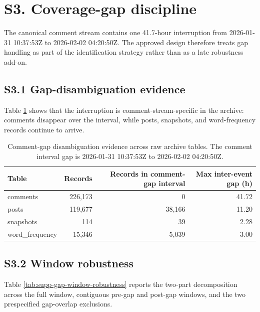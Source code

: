 \section*{S3. Coverage-gap discipline}
\SupplementMixedEvidenceNote

The canonical comment stream contains one 41.7-hour interruption from
2026-01-31 10:37:53Z to 2026-02-02 04:20:50Z. The approved design therefore
treats gap handling as part of the identification strategy rather than as a
late robustness add-on.

\subsection*{S3.1 Gap-disambiguation evidence}

Table \ref{tab:supp-gap-disambiguation} shows that the interruption is
comment-stream-specific in the archive: comments disappear over the interval,
while posts, snapshots, and word-frequency records continue to arrive.

\begin{table}[h]
\centering
\caption{Comment-gap disambiguation evidence across raw archive tables. The
comment interval gap is 2026-01-31 10:37:53Z to 2026-02-02 04:20:50Z.}
\label{tab:supp-gap-disambiguation}
\small
\begin{tabular}{@{}lrrr@{}}
\toprule
\textbf{Table} & \textbf{Records} & \textbf{Records in comment-gap interval} & \textbf{Max inter-event gap (h)} \\
\midrule
comments & 226,173 & 0 & 41.72 \\
posts & 119,677 & 38,166 & 11.20 \\
snapshots & 114 & 39 & 2.28 \\
word\_frequency & 15,346 & 5,039 & 3.00 \\
\bottomrule
\end{tabular}
\end{table}

\subsection*{S3.2 Window robustness}

Table \ref{tab:supp-gap-window-robustness} reports the two-part decomposition
across the full window, contiguous pre-gap and post-gap windows, and the two
prespecified gap-overlap exclusions.

